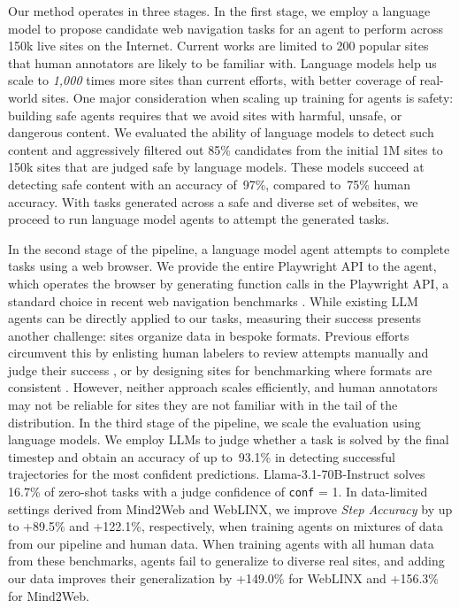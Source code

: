 Our method operates in three stages. In the first stage, we employ a language model to propose candidate web navigation tasks for an agent to perform across 150k live sites on the Internet. Current works are limited to 200 popular sites \citep{WebLINX,AndroidInTheWild,Mind2Web} that human annotators are likely to be familiar with. Language models help us scale to \textit{1,000} times more sites than current efforts, with better coverage of real-world sites. One major consideration when scaling up training for agents is safety: building safe agents requires that we avoid sites with harmful, unsafe, or dangerous content. We evaluated the ability of language models to detect such content and aggressively filtered out 85\% candidates from the initial 1M sites to 150k sites that are judged safe by language models. These models succeed at detecting safe content with an accuracy of~97\%, compared to~75\% human accuracy. With tasks generated across a safe and diverse set of websites, we proceed to run language model agents to attempt the generated tasks.

In the second stage of the pipeline, a language model agent attempts to complete tasks using a web browser. We provide the entire Playwright API to the agent, which operates the browser by generating function calls in the Playwright API, a standard choice in recent web navigation benchmarks \citep{BrowserGym,AnyTool,WorkArena}. While existing LLM agents can be directly applied to our tasks, measuring their success presents another challenge: sites organize data in bespoke formats. Previous efforts circumvent this by enlisting human labelers to review attempts manually and judge their success \citep{WebLINX,Mind2Web}, or by designing sites for benchmarking where formats are consistent \citep{WebArena,VisualWebArena}. However, neither approach scales efficiently, and human annotators may not be reliable for sites they are not familiar with in the tail of the distribution. In the third stage of the pipeline, we scale the evaluation using language models. We employ LLMs to judge \citep{VerifyStepByStep} whether a task is solved by the final timestep and obtain an accuracy of up to~93.1\% in detecting successful trajectories for the most confident predictions. Llama-3.1-70B-Instruct solves 16.7\% of zero-shot tasks with a judge confidence of \texttt{conf} = 1. In data-limited settings derived from Mind2Web and WebLINX, we improve \textit{Step Accuracy} by up to +89.5\% and +122.1\%, respectively, when training agents on mixtures of data from our pipeline and human data. When training agents with all human data from these benchmarks, agents fail to generalize to diverse real sites, and adding our data improves their generalization by +149.0\% for WebLINX and +156.3\% for Mind2Web.

